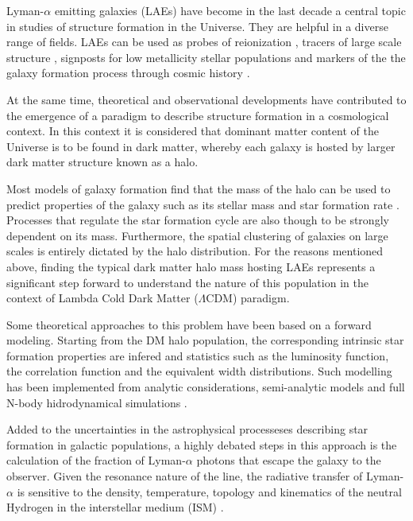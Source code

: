 \documentclass[usenatbib]{mn2e}
\begin{document}
Lyman-$\alpha$ emitting galaxies (LAEs) have become in the last decade a 
central topic in studies of structure formation in the Universe. They 
are helpful in a diverse range of fields. LAEs can
be used as probes of reionization \citep{Dijkstra11}, tracers of
large scale structure \citep{Koehler2007}, 
signposts for low metallicity stellar populations and markers of the
the galaxy formation process through cosmic history \citep{ForeroRomero2012}.  


At the same time, theoretical and observational developments have
contributed to the emergence of a paradigm to describe structure
formation in a cosmological context. In this context it is considered
that dominant matter content of the Universe is to be found in dark
matter, whereby each galaxy is hosted by larger dark matter structure
known as a halo. 

Most models of galaxy formation find that the mass of the halo can be
used to predict properties of the galaxy such as its stellar mass and
star formation rate \citep{Behroozi2012}. Processes that regulate the
star formation cycle are also though to be strongly dependent on its
mass. Furthermore, the spatial clustering of galaxies on large scales
is entirely dictated by the halo distribution.  For the reasons
mentioned above, finding the typical dark matter halo mass hosting
LAEs represents a significant step forward to understand the nature of
this population in the context of Lambda Cold Dark Matter
($\Lambda$CDM) paradigm.  

Some theoretical approaches to this problem have been based on a
forward modeling. Starting from the DM halo population, the
corresponding intrinsic star formation properties are infered and
statistics such as the luminosity function, the correlation function
and the equivalent width distributions. Such modelling has been
implemented from analytic considerations, semi-analytic models
 and 
full N-body hidrodynamical simulations
\citep{Dayal2009, ForeroRomero2011, Yajima2012, ForeroRomero2012} . 

Added to the uncertainties in the astrophysical processeses describing
star formation in galactic populations, a highly debated steps in this
approach is the calculation of the fraction of Lyman-$\alpha$ photons
that escape the galaxy to the observer. Given the resonance nature of
the line, the radiative transfer of Lyman-$\alpha$ is sensitive to the
density, temperature, topology and kinematics of the neutral Hydrogen
in the interstellar medium (ISM) \citep{Neufeld1991, ForeroRomero2011,
Laursen2013}.  
\end{document}
